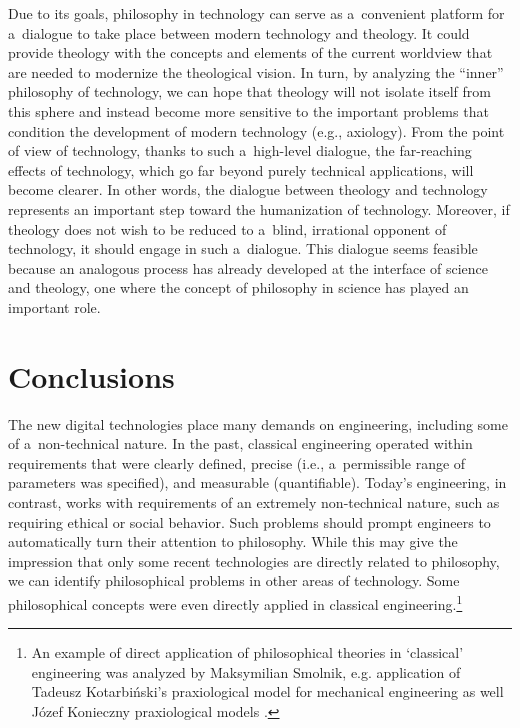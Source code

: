 Due to its goals, philosophy in technology can serve as a~convenient platform for a~dialogue to take place between modern technology and theology. It could provide theology with the concepts and elements of the current worldview that are needed to modernize the theological vision. In turn, by analyzing the ``inner'' philosophy of technology, we can hope that theology will not isolate itself from this sphere and instead become more sensitive to the important problems that condition the development of modern technology (e.g., axiology). From the point of view of technology, thanks to such a~high-level dialogue, the far-reaching effects of technology, which go far beyond purely technical applications, will become clearer. In other words, the dialogue between theology and technology represents an important step toward the humanization of technology. Moreover, if theology does not wish to be reduced to a~blind, irrational opponent of technology, it should engage in such a~dialogue. This dialogue seems feasible because an analogous process has already developed at the interface of science and theology, one where the concept of philosophy in science has played an important role.



\section{Conclusions}

The new digital technologies place many demands on engineering, including some of a~non-technical nature. In the past, classical engineering operated within requirements that were clearly defined, precise (i.e., a~permissible range of parameters was specified), and measurable (quantifiable). Today's engineering, in contrast, works with requirements of an extremely non-technical nature, such as requiring ethical or social behavior. Such problems should prompt engineers to automatically turn their attention to philosophy. While this may give the impression that only some recent technologies are directly related to philosophy, we can identify philosophical problems in other areas of technology. Some philosophical concepts were even directly applied in classical engineering.\footnote{An example of direct application of philosophical theories in ‘classical' engineering was analyzed by Maksymilian Smolnik, e.g. application of Tadeusz Kotarbiński's praxiological model for mechanical engineering 
\parencite[][]{smolnik_praxiological_2018} %
 as well Józef Konieczny praxiological models 
\parencite[][]{smolnik_comparative_2017}.%
}




